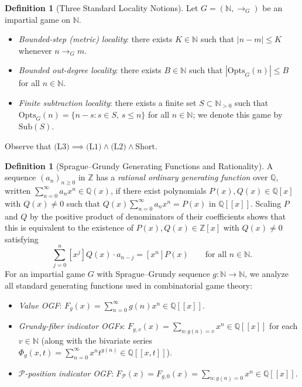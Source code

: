 \documentclass[11pt]{article}
\theoremstyle{definition}
\newtheorem{definition}[theorem]{Definition}
\theoremstyle{remark}
\newcommand{\N}{\mathbb{N}}
\newcommand{\Z}{\mathbb{Z}}
\newcommand{\Q}{\mathbb{Q}}
\newcommand{\Ppos}{\mathcal{P}}
\newcommand{\Opts}{\mathrm{Opts}}
\newcommand{\Sub}{\mathrm{Sub}}
\begin{document}
\begin{definition}[Three Standard Locality Notions]
\label{def:locality}
Let $G = (\N, \to_G)$ be an impartial game on $\N$.
\begin{itemize}
  \item[\textup{(L1)}] \emph{Bounded-step (metric) locality}: there exists $K \in \N$ such that $|n - m| \le K$ whenever $n \to_G m$.
  \item[\textup{(L2)}] \emph{Bounded out-degree locality}: there exists $B \in \N$ such that $|\Opts_G(n)| \le B$ for all $n \in \N$.
  \item[\textup{(L3)}] \emph{Finite subtraction locality}: there exists a finite set $S \subset \N_{>0}$ such that $\Opts_G(n) = \{n - s : s \in S,\, s \le n\}$ for all $n \in \N$; we denote this game by $\Sub(S)$.
\end{itemize}
Observe that $\text{(L3)} \implies \text{(L1)} \land \text{(L2)} \land \text{Short}$.
\end{definition}

\begin{definition}[Sprague--Grundy Generating Functions and Rationality]
\label{def:gf}
A sequence $(a_n)_{n \ge 0}$ in $\Z$ has a \emph{rational ordinary generating function} over $\Q$, written $\sum_{n=0}^{\infty} a_n x^n \in \Q(x)$, if there exist polynomials $P(x), Q(x) \in \Q[x]$ with $Q(x) \neq 0$ such that $Q(x) \sum_{n=0}^{\infty} a_n x^n = P(x)$ in $\Q[[x]]$. Scaling $P$ and $Q$ by the positive product of denominators of their coefficients shows that this is equivalent to the existence of $P(x), Q(x) \in \Z[x]$ with $Q(x) \neq 0$ satisfying
\[
  \sum_{j=0}^{n} [x^j]Q(x) \cdot a_{n-j} = [x^n]P(x) \qquad \text{for all } n \in \N.
\]
For an impartial game $G$ with Sprague--Grundy sequence $g : \N \to \N$, we analyze all standard generating functions used in combinatorial game theory:
\begin{itemize}
  \item[\textup{(GF1)}] \emph{Value OGF}: $F_g(x) = \sum_{n=0}^{\infty} g(n) x^n \in \Q[[x]]$.
  \item[\textup{(GF2)}] \emph{Grundy-fiber indicator OGFs}: $F_{g,v}(x) = \sum_{n : g(n)=v} x^n \in \Q[[x]]$ for each $v \in \N$ (along with the bivariate series $\Phi_g(x,t) = \sum_{n=0}^{\infty} x^n t^{g(n)} \in \Q[[x,t]]$).
  \item[\textup{(GF3)}] \emph{$\Ppos$-position indicator OGF}: $F_{\Ppos}(x) = F_{g,0}(x) = \sum_{n : g(n)=0} x^n \in \Q[[x]]$.
\end{itemize}
\end{definition}
\end{document}
